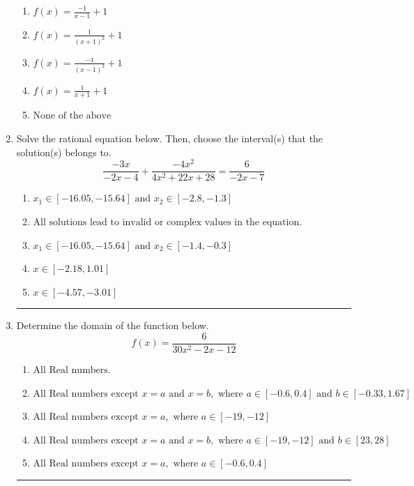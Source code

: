 \documentclass[14pt]{extbook}
\newcommand{\litem}[1]{\item#1\hspace*{-1cm}\rule{\textwidth}{0.4pt}}
\begin{document}
\begin{enumerate}
{\begin{center}
\end{center}
\begin{enumerate}[label=\Alph*.]
\item \( f(x) = \frac{-1}{x - 1} + 1 \)
\item \( f(x) = \frac{1}{(x + 1)^2} + 1 \)
\item \( f(x) = \frac{-1}{(x - 1)^2} + 1 \)
\item \( f(x) = \frac{1}{x + 1} + 1 \)
\item \( \text{None of the above} \)

\end{enumerate} }
\litem{
Solve the rational equation below. Then, choose the interval(s) that the solution(s) belongs to.\[ \frac{-3x}{-2x -4} + \frac{-4x^{2}}{4x^{2} +22 x + 28} = \frac{6}{-2x -7} \]\begin{enumerate}[label=\Alph*.]
\item \( x_1 \in [-16.05, -15.64] \text{ and } x_2 \in [-2.8,-1.3] \)
\item \( \text{All solutions lead to invalid or complex values in the equation.} \)
\item \( x_1 \in [-16.05, -15.64] \text{ and } x_2 \in [-1.4,-0.3] \)
\item \( x \in [-2.18,1.01] \)
\item \( x \in [-4.57,-3.01] \)

\end{enumerate} }
\litem{
Determine the domain of the function below.\[ f(x) = \frac{6}{30x^{2} -2 x -12} \]\begin{enumerate}[label=\Alph*.]
\item \( \text{All Real numbers.} \)
\item \( \text{All Real numbers except } x = a \text{ and } x = b, \text{ where } a \in [-0.6, 0.4] \text{ and } b \in [-0.33, 1.67] \)
\item \( \text{All Real numbers except } x = a, \text{ where } a \in [-19, -12] \)
\item \( \text{All Real numbers except } x = a \text{ and } x = b, \text{ where } a \in [-19, -12] \text{ and } b \in [23, 28] \)
\item \( \text{All Real numbers except } x = a, \text{ where } a \in [-0.6, 0.4] \)


\end{enumerate}}
\end{enumerate}
\end{document}
